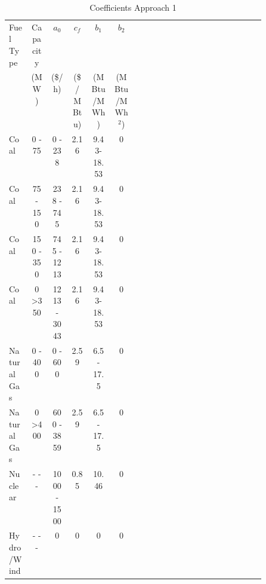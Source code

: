 \documentclass[12pt]{article}
\numberwithin{equation}{section}
\numberwithin{table}{section}
\numberwithin{figure}{section}
\begin{document}
\begin{table}
\centering
\begin{threeparttable}
\caption{Coefficients Approach 1}
\label{tab_coa}
\footnotesize
\begin{tabular}{l c c c c c p{0.50\linewidth}}
\toprule
Fuel Type & Capacity & $a_0$  & $c_f$     & $b_1$      & $b_2$ \\
          & (MW)     & (\$/h) & (\$/MBtu) & (MBtu/MWh) & (MBtu/MWh$^2$) \\
\midrule
Coal      & 0 - 75      & 0 - 238      & 2.16   & 9.43-18.53    & 0  \\
Coal      & 75 - 150    & 238 - 745    & 2.16   & 9.43-18.53    & 0 \\
Coal      & 150 - 350   & 745 - 1213   & 2.16   & 9.43-18.53    & 0  \\
Coal      & 0 \textgreater 350   & 1213 - 3043      & 2.16   & 9.43-18.53    & 0 \\
Natural Gas       & 0 - 400  & 0 - 600      &  2.59    & 6.5 - 17.5    & 0 \\
Natural Gas       & 0 \textgreater 400    & 600 - 3859   &  2.59   & 6.5 - 17.5     & 0 \\
Nuclear           & - - -    & 1000 - 1500  &  0.85   & 10.46          & 0      \\
Hydro/Wind        & - - -    & 0            &  0      & 0              & 0      \\
\bottomrule
\end{tabular}
\end{threeparttable}
\end{table}
\end{document}
